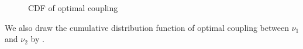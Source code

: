 \begin{rmk}
\begin{figure}[ht]
\begin{minipage}{.49\textwidth}
			\caption{CDF of optimal coupling}
		\end{minipage}
	\end{figure}
	We also draw the cumulative distribution function
	of optimal coupling between $\nu_1$ and $\nu_2$
	by \cite[Theorem 2.18]{villani2003topics}.
\end{rmk}
